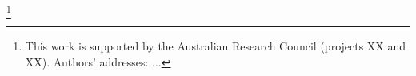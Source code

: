 \documentclass[acmsmall,review=true,anonymous=true]{acmart}
\begin{document}
\thanks{This work is supported by the Australian Research Council
(projects XX and XX).
Authors' addresses: ...
} 


\maketitle

















\end{document}
